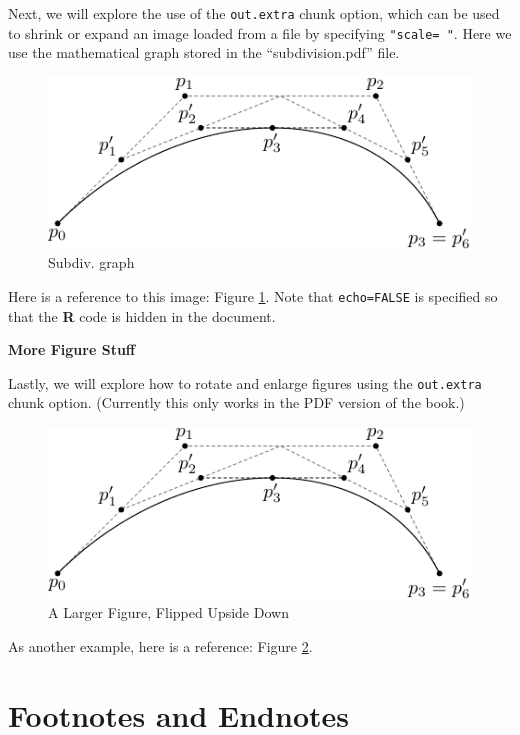 \documentclass[12pt, twoside]{amherstthesis}
\begin{document}
Next, we will explore the use of the \texttt{out.extra} chunk option, which can be used to shrink or expand an image loaded from a file by specifying \texttt{"scale=\ "}. Here we use the mathematical graph stored in the ``subdivision.pdf'' file.
\begin{figure}

{\centering \includegraphics[scale=0.75]{figures/subdivision} 

}

\caption{Subdiv. graph}\label{fig:subd}
\end{figure}
Here is a reference to this image: Figure \ref{fig:subd}. Note that \texttt{echo=FALSE} is specified so that the \textbf{R} code is hidden in the document.

\textbf{More Figure Stuff}

Lastly, we will explore how to rotate and enlarge figures using the \texttt{out.extra} chunk option. (Currently this only works in the PDF version of the book.)
\begin{figure}

{\centering \includegraphics[angle=180, scale=1.1]{figures/subdivision} 

}

\caption{A Larger Figure, Flipped Upside Down}\label{fig:subd2}
\end{figure}
As another example, here is a reference: Figure \ref{fig:subd2}.

\hypertarget{footnotes-and-endnotes}{%
\section{Footnotes and Endnotes}\label{footnotes-and-endnotes}}
\end{document}
